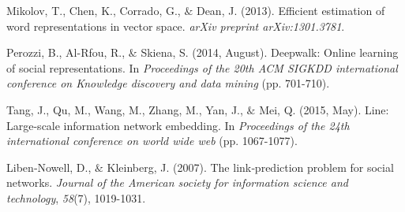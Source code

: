 \documentclass[12pt]{article}
\renewcommand{\_}{\kern-1.5pt\textunderscore\kern-1.5pt}
\begin{document}
\vspace{\baselineskip}
\begin{justify}
\textcolor[HTML]{222222}{Mikolov, T., Chen, K., Corrado, G., $\&$  Dean, J. (2013). Efficient estimation of word representations in vector space. \textit{arXiv preprint arXiv:1301.3781}.}
\end{justify}

\vspace{\baselineskip}
\begin{justify}
\textcolor[HTML]{222222}{Perozzi, B., Al-Rfou, R., $\&$  Skiena, S. (2014, August). Deepwalk: Online learning of social representations. In \textit{Proceedings of the 20th ACM SIGKDD international conference on Knowledge discovery and data mining} (pp. 701-710).}
\end{justify}

\vspace{\baselineskip}
\begin{justify}
\textcolor[HTML]{222222}{Tang, J., Qu, M., Wang, M., Zhang, M., Yan, J., $\&$  Mei, Q. (2015, May). Line: Large-scale information network embedding. In \textit{Proceedings of the 24th international conference on world wide web} (pp. 1067-1077).}
\end{justify}

\vspace{\baselineskip}
\begin{justify}
\textcolor[HTML]{222222}{Liben‐Nowell, D., $\&$  Kleinberg, J. (2007). The link‐prediction problem for social networks. \textit{Journal of the American society for information science and technology}, \textit{58}(7), 1019-1031.}
\end{justify}

\vspace{\baselineskip}
\printbibliography
\end{document}

